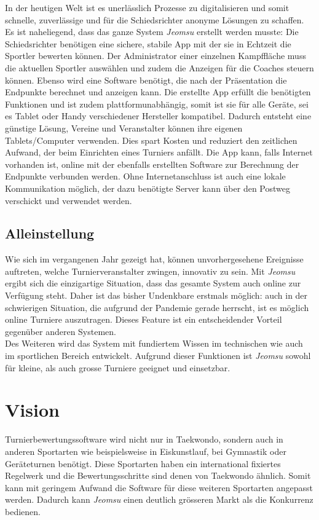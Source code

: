 In der heutigen Welt ist es unerlässlich Prozesse zu digitalisieren und somit schnelle,
    zuverlässige und für die Schiedsrichter anonyme Lösungen zu schaffen.
\\
Es ist naheliegend, dass das ganze System \textit{Jeomsu} erstellt werden musste:
Die Schiedsrichter benötigen eine sichere, stabile App mit der sie in Echtzeit die Sportler bewerten können.
Der Administrator einer einzelnen Kampffläche muss die aktuellen Sportler auswählen und zudem die Anzeigen für die
Coaches steuern können.
Ebenso wird eine Software benötigt, die nach der Präsentation die Endpunkte berechnet und anzeigen kann. 
Die erstellte App erfüllt die benötigten Funktionen und ist zudem plattformunabhängig, somit ist sie für alle Geräte,
    sei es Tablet oder Handy verschiedener Hersteller kompatibel.
Dadurch entsteht eine günstige Lösung, Vereine und Veranstalter können ihre eigenen Tablets/Computer verwenden.
Dies spart Kosten und reduziert den zeitlichen Aufwand, der beim Einrichten eines Turniers anfällt.
Die App kann, falls Internet vorhanden ist, online mit der ebenfalls erstellten Software zur Berechnung der Endpunkte verbunden werden.
Ohne Internetanschluss ist auch eine lokale Kommunikation möglich, der dazu benötigte Server kann über den
    Postweg verschickt und verwendet werden.

\subsection{Alleinstellung}

Wie sich im vergangenen Jahr gezeigt hat, können unvorhergesehene Ereignisse auftreten, welche Turnierveranstalter
    zwingen, innovativ zu sein.
Mit \textit{Jeomsu} ergibt sich die einzigartige Situation, dass das gesamte System auch online zur Verfügung steht.
Daher ist das bisher Undenkbare erstmals möglich: auch in der schwierigen Situation, die aufgrund der Pandemie gerade
herrscht, ist es möglich online Turniere auszutragen.
Dieses Feature ist ein entscheidender Vorteil gegenüber anderen Systemen.
\\
Des Weiteren wird das System mit fundiertem Wissen im technischen wie auch im sportlichen Bereich entwickelt.
Aufgrund dieser Funktionen ist \textit{Jeomsu} sowohl für kleine, als auch grosse Turniere geeignet und einsetzbar.

\section{Vision}

Turnierbewertungssoftware wird nicht nur in Taekwondo, sondern auch in anderen Sportarten wie beispielsweise in
Eiskunstlauf,
    bei Gymnastik oder Geräteturnen benötigt.
Diese Sportarten haben ein international fixiertes Regelwerk und die Bewertungsschritte sind denen von Taekwondo ähnlich.
Somit kann mit geringem Aufwand die Software für diese weiteren Sportarten angepasst werden.
Dadurch kann \textit{Jeomsu} einen deutlich grösseren Markt als die Konkurrenz bedienen.